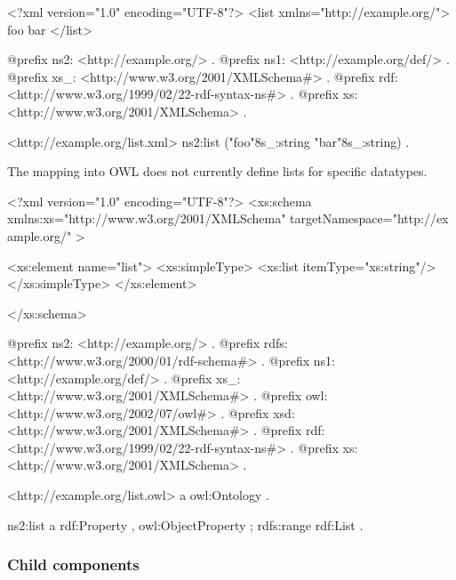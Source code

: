 \begin{DoxyCodeInclude}
<?xml version="1.0" encoding="UTF-8"?>
<list xmlns="http://example.org/">
        foo
        bar
</list>

\end{DoxyCodeInclude}
 
\begin{DoxyCodeInclude}
@prefix ns2:     <http://example.org/> .
@prefix ns1:     <http://example.org/def/> .
@prefix xs_:     <http://www.w3.org/2001/XMLSchema#> .
@prefix rdf:     <http://www.w3.org/1999/02/22-rdf-syntax-ns#> .
@prefix xs:      <http://www.w3.org/2001/XMLSchema> .

<http://example.org/list.xml>
      ns2:list ("foo"^^xs_:string "bar"^^xs_:string) .
\end{DoxyCodeInclude}


The mapping into OWL does not currently define lists for specific datatypes.


\begin{DoxyCodeInclude}
<?xml version="1.0" encoding="UTF-8"?>
<xs:schema xmlns:xs="http://www.w3.org/2001/XMLSchema" targetNamespace="http://ex
      ample.org/" >

        <xs:element name="list">        
                <xs:simpleType>
                        <xs:list itemType="xs:string"/>
                </xs:simpleType>
        </xs:element>

</xs:schema>
\end{DoxyCodeInclude}
 
\begin{DoxyCodeInclude}
@prefix ns2:     <http://example.org/> .
@prefix rdfs:    <http://www.w3.org/2000/01/rdf-schema#> .
@prefix ns1:     <http://example.org/def/> .
@prefix xs_:     <http://www.w3.org/2001/XMLSchema#> .
@prefix owl:     <http://www.w3.org/2002/07/owl#> .
@prefix xsd:     <http://www.w3.org/2001/XMLSchema#> .
@prefix rdf:     <http://www.w3.org/1999/02/22-rdf-syntax-ns#> .
@prefix xs:      <http://www.w3.org/2001/XMLSchema> .

<http://example.org/list.owl>
      a       owl:Ontology .

ns2:list
      a       rdf:Property , owl:ObjectProperty ;
      rdfs:range rdf:List .
\end{DoxyCodeInclude}
\hypertarget{list_annotationChildren}{}\subsubsection{Child components}\label{list_annotationChildren}

